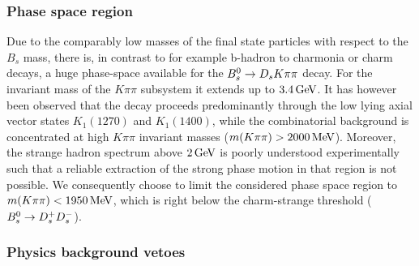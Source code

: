 %
%
 
 \subsubsection{Phase space region}
 \label{ssec:phasespace}

Due to the comparably low masses of the final state particles  with respect to the $B_s$ mass,
there is, in contrast to for example b-hadron to charmonia or charm decays, a huge phase-space available for the ${{B}^0_{s}}\rightarrow{\ensuremath{{D}_{s}}}{\ensuremath{K}}{\ensuremath{\pi}}{\ensuremath{\pi}}$ decay.
For the invariant mass of the $K\pi\pi$ subsystem it extends up to $3.4 \mathrm{\,Ge\kern -0.1em V}$.
It has however been observed that the decay proceeds predominantly through the low lying axial vector states $K_{1}(1270)$ and $K_{1}(1400)$, while
the combinatorial background is concentrated at high $K\pi\pi$ invariant masses ($m(K\pi\pi) > 2000 \mathrm{\,Me\kern -0.1em V}$).
Moreover, the strange hadron spectrum above $2\mathrm{\,Ge\kern -0.1em V}$ is poorly understood experimentally such that a reliable extraction of the strong phase motion in that region is not possible.
We consequently choose to limit the considered phase space region to $m(K\pi\pi) < 1950 \mathrm{\,Me\kern -0.1em V}$, which is right below the charm-strange threshold (${{B}^0_{s}}\rightarrow{\ensuremath{{D}^+_{s}}}{\ensuremath{{D}^-_{s}}}$).
 
 \clearpage
\subsubsection{Physics background vetoes}
 \label{ssec:vetoes}

